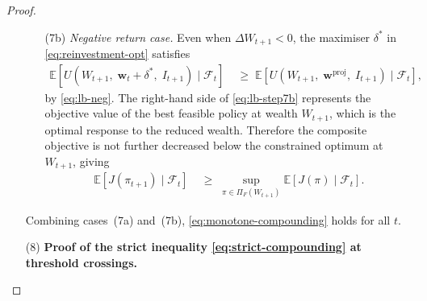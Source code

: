 \documentclass[12pt,openany]{book}
\newcommand{\bfw}{\mathbf{w}}
\newcommand{\calF}{\mathcal{F}}
\newcommand{\calI}{\mathcal{I}}
\newcommand{\E}{\mathbb{E}}
\numberwithin{equation}{chapter}
\theoremstyle{plain}
\theoremstyle{definition}
\theoremstyle{remark}
\numberwithin{equation}{chapter}
\theoremstyle{plain}
\def\calI{I}%
\begin{document}
\begin{proof}
\begin{enumerate}
\begin{enumerate}
          \item[\textup{(7b)}] \emph{Negative return case.}
                Even when $\Delta W_{t+1} < 0$, the maximiser
                $\delta^*$ in \eqref{eq:reinvestment-opt}
                satisfies
                \begin{align}
                  \E\!\left[
                    U(W_{t+1},\; \bfw_t + \delta^*,\;
                    \calI_{t+1})
                    \mid \calF_t
                  \right]
                  &\;\geq\;
                  \E\!\left[
                    U(W_{t+1},\; \bfw^{\mathrm{proj}},\;
                    \calI_{t+1})
                    \mid \calF_t
                  \right],
                  \label{eq:lb-step7b}
                \end{align}
                by \eqref{eq:lb-neg}.  The right-hand side of
                \eqref{eq:lb-step7b} represents the objective
                value of the best feasible policy at wealth
                $W_{t+1}$, which is the optimal response to the
                reduced wealth.  Therefore the composite objective
                is not further decreased below the constrained
                optimum at $W_{t+1}$, giving
                \begin{align}
                  \E\!\left[J(\pi_{t+1}) \mid \calF_t\right]
                  &\;\geq\;
                  \sup_{\pi \in \Pi_F(W_{t+1})}
                  \E\!\left[J(\pi) \mid \calF_t\right].
                  \label{eq:neg-result}
                \end{align}
        \end{enumerate}

        Combining cases~(7a) and~(7b), \eqref{eq:monotone-compounding}
        holds for all $t$.

  \item[\textup{(8)}] \textbf{Proof of the strict inequality
        \eqref{eq:strict-compounding} at threshold crossings.}


\end{enumerate}
\end{proof}
\end{document}
